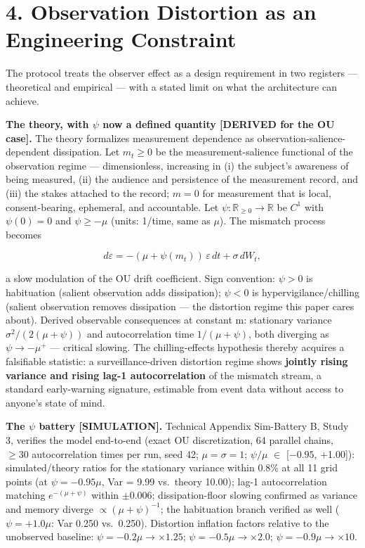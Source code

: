 \documentclass[
]{article}
\begin{document}
\section{4. Observation Distortion as an Engineering
Constraint}\label{observation-distortion-as-an-engineering-constraint}

The protocol treats the observer effect as a design requirement in two
registers --- theoretical and empirical --- with a stated limit on what
the architecture can achieve.

\textbf{The theory, with \(\psi\) now a defined quantity {[}DERIVED for
the OU case{]}.} The theory formalizes measurement dependence as
observation-salience-dependent dissipation. Let \(m_t \geq 0\) be the
measurement-salience functional of the observation regime ---
dimensionless, increasing in (i) the subject's awareness of being
measured, (ii) the audience and persistence of the measurement record,
and (iii) the stakes attached to the record; \(m = 0\) for measurement
that is local, consent-bearing, ephemeral, and accountable. Let
\(\psi : \mathbb{R}_{\geq 0} \to \mathbb{R}\) be \(C^1\) with
\(\psi(0) = 0\) and \(\psi \geq -\mu\) (units: 1/time, same as \(\mu\)).
The mismatch process becomes

\begin{equation}
 d\varepsilon = -(\mu + \psi(m_t))\,\varepsilon\, dt + \sigma\, dW_t, \label{eq:ou}
\end{equation}

a slow modulation of the OU drift coefficient. Sign convention:
\(\psi > 0\) is habituation (salient observation adds dissipation);
\(\psi < 0\) is hypervigilance/chilling (salient observation removes
dissipation --- the distortion regime this paper cares about). Derived
observable consequences at constant m: stationary variance
\(\sigma^2/(2(\mu + \psi))\) and autocorrelation time
\(1/(\mu + \psi)\), both diverging as \(\psi \to -\mu^{+}\) --- critical
slowing. The chilling-effects hypothesis thereby acquires a falsifiable
statistic: a surveillance-driven distortion regime shows \textbf{jointly
rising variance and rising lag-1 autocorrelation} of the mismatch
stream, a standard early-warning signature, estimable from event data
without access to anyone's state of mind.

\textbf{The \(\psi\) battery {[}SIMULATION{]}.} Technical Appendix
Sim-Battery B, Study 3, verifies the model end-to-end (exact OU
discretization, 64 parallel chains, \(\geq 30\) autocorrelation times
per run, seed 42; \(\mu = \sigma = 1\); \(\psi /\mu\) \(\in\)
{[}\(-0.95\), +1.00{]}): simulated/theory ratios for the stationary
variance within 0.8\% at all 11 grid points (at \(\psi = -0.95\mu\), Var
= 9.99 vs.~theory 10.00); lag-1 autocorrelation matching
\(e^{-(\mu+\psi)}\) within \(\pm 0.006\); dissipation-floor slowing
confirmed as variance and memory diverge \(\propto (\mu+\psi)^{-1}\);
the habituation branch verified as well (\(\psi = +1.0\mu\): Var 0.250
vs.~0.250). Distortion inflation factors relative to the unobserved
baseline: \(\psi = -0.2\mu \to \times 1.25\);
\(\psi = -0.5\mu \to \times 2.0\); \(\psi = -0.9\mu \to \times 10\).
\end{document}
